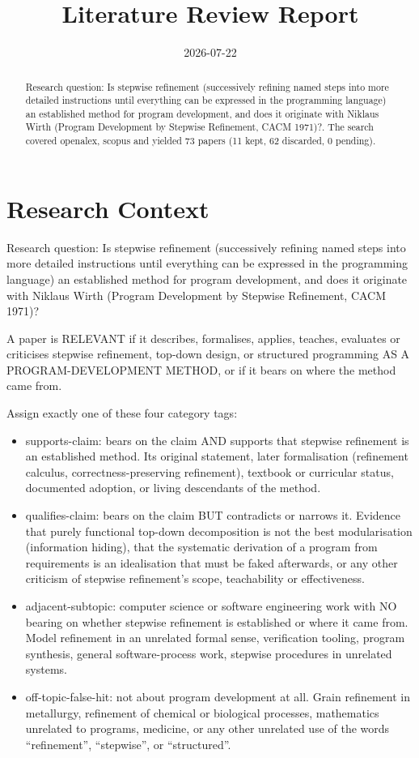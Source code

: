 \documentclass{article}
\title{Literature Review Report}
\date{2026-07-22}
\begin{document}
\maketitle

\begin{abstract}
Research question: Is stepwise refinement (successively refining named steps into more detailed instructions until everything can be expressed in the programming language) an established method for program development, and does it originate with Niklaus Wirth (Program Development by Stepwise Refinement, CACM 1971)?. The search covered openalex, scopus and yielded 73 papers (11 kept, 62 discarded, 0 pending).
\end{abstract}
\clearpage
\clearpage
\tableofcontents
\clearpage

\section{Research Context}
Research question: Is stepwise refinement (successively refining named
steps into more detailed instructions until everything can be expressed
in the programming language) an established method for program
development, and does it originate with Niklaus Wirth (Program
Development by Stepwise Refinement, CACM 1971)?

A paper is RELEVANT if it describes, formalises, applies, teaches,
evaluates or criticises stepwise refinement, top-down design, or
structured programming AS A PROGRAM-DEVELOPMENT METHOD, or if it bears
on where the method came from.

Assign exactly one of these four category tags:

\begin{itemize}
\item
  supports-claim: bears on the claim AND supports that stepwise
  refinement is an established method. Its original statement, later
  formalisation (refinement calculus, correctness-preserving
  refinement), textbook or curricular status, documented adoption, or
  living descendants of the method.
\item
  qualifies-claim: bears on the claim BUT contradicts or narrows it.
  Evidence that purely functional top-down decomposition is not the best
  modularisation (information hiding), that the systematic derivation of
  a program from requirements is an idealisation that must be faked
  afterwards, or any other criticism of stepwise refinement's scope,
  teachability or effectiveness.
\item
  adjacent-subtopic: computer science or software engineering work with
  NO bearing on whether stepwise refinement is established or where it
  came from. Model refinement in an unrelated formal sense, verification
  tooling, program synthesis, general software-process work, stepwise
  procedures in unrelated systems.
\item
  off-topic-false-hit: not about program development at all. Grain
  refinement in metallurgy, refinement of chemical or biological
  processes, mathematics unrelated to programs, medicine, or any other
  unrelated use of the words ``refinement'', ``stepwise'', or
  ``structured''.
\end{itemize}
\end{document}
